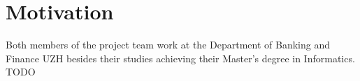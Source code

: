 \section{Motivation}
Both members of the project team work at the Department of Banking and Finance UZH besides their studies achieving their Master’s degree in Informatics. TODO
